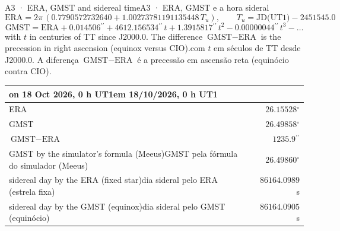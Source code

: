 \documentclass[aspectratio=169,11pt]{beamer}
\newcommand{\tr}[2]{\ifEN#2\else#1\fi}
\newcommand{\asec}{\ensuremath{{}^{\prime\prime}}}
\newcommand{\gr}{\ensuremath{{}^{\circ}}}
\begin{document}
\begin{frame}{\tr{A3 · ERA, GMST e a hora sideral}{A3 · ERA, GMST and sidereal time}}
  \footnotesize
  \[ \text{ERA} = 2\pi\,(\num{0.7790572732640} + \num{1.00273781191135448}\,T_u), \qquad T_u = \text{JD(UT1)} - \num{2451545.0} \]
  \[ \text{GMST} = \text{ERA} + \num{0.014506}\asec + \num{4612.156534}\asec\,t + \num{1.3915817}\asec\,t^{2} - \num{0.00000044}\asec\,t^{3} - \ldots \]
  \tr{com $t$ em séculos de TT desde J2000.0. A diferença $\text{GMST}-\text{ERA}$ é a precessão em ascensão reta (equinócio contra CIO).}{with $t$ in centuries of TT since J2000.0. The difference $\text{GMST}-\text{ERA}$ is the precession in right ascension (equinox versus CIO).}
  \medskip

  \renewcommand{\arraystretch}{1.3}
  \begin{tabular}{@{}lr@{}}
    \toprule
    \tr{em 18/10/2026, 0 h UT1}{on 18 Oct 2026, 0 h UT1} & \\
    \midrule
    ERA & $\num{26.15528}\gr$ \\
    GMST & $\num{26.49858}\gr$ \\
    $\text{GMST}-\text{ERA}$ & $\num{1235.9}\asec$ \\
    \tr{GMST pela fórmula do simulador (Meeus)}{GMST by the simulator's formula (Meeus)} & $\num{26.49860}\gr$ \\
    \tr{dia sideral pelo ERA (estrela fixa)}{sidereal day by the ERA (fixed star)} & $\num{86164.0989}$ s \\
    \tr{dia sideral pelo GMST (equinócio)}{sidereal day by the GMST (equinox)} & $\num{86164.0905}$ s \\
    \bottomrule
  \end{tabular}
\end{frame}
\end{document}
